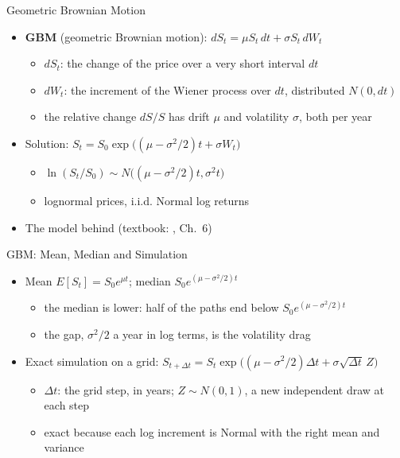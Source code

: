 \begin{frame}{Geometric Brownian Motion}
\itemsize{\footnotesize}
\begin{itemize}
    \item \textbf{GBM} (geometric Brownian motion): $dS_t = \mu S_t\,dt + \sigma S_t\,dW_t$
    \begin{itemize}
        \item $dS_t$: the change of the price over a very short interval $dt$
        \item $dW_t$: the increment of the Wiener process over $dt$, distributed $N(0, dt)$
        \item the relative change $dS/S$ has drift $\mu$ and volatility $\sigma$, both per year
    \end{itemize}
    \item Solution: $S_t = S_0\exp\big((\mu - \sigma^2/2)t + \sigma W_t\big)$
    \begin{itemize}
        \item $\ln(S_t/S_0) \sim N\big((\mu - \sigma^2/2)t, \sigma^2 t\big)$
        \item lognormal prices, i.i.d. Normal log returns
    \end{itemize}
    \item The model behind  (textbook: , Ch.~6)
\end{itemize}
\end{frame}

\begin{frame}{GBM: Mean, Median and Simulation}
\itemsize{\small}
\begin{itemize}
    \item Mean $E[S_t] = S_0e^{\mu t}$; median $S_0e^{(\mu - \sigma^2/2)t}$
    \begin{itemize}
        \item the median is lower: half of the paths end below $S_0e^{(\mu - \sigma^2/2)t}$
        \item the gap, $\sigma^2/2$ a year in log terms, is the volatility drag
    \end{itemize}
    \item Exact simulation on a grid: $S_{t + \Delta t} = S_t\exp\big((\mu - \sigma^2/2)\Delta t + \sigma\sqrt{\Delta t}\,Z\big)$
    \begin{itemize}
        \item $\Delta t$: the grid step, in years; $Z \sim N(0, 1)$, a new independent draw at each step
        \item exact because each log increment is Normal with the right mean and variance
    \end{itemize}
\end{itemize}
\end{frame}

